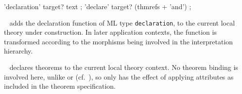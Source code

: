 \begin{isabellebody}
\begin{isamarkuptext}
  \begin{rail}
    'declaration' target? text
    ;
    'declare' target? (thmrefs + 'and')
    ;
  \end{rail}

  \begin{description}

  \item \hyperlink{command.declaration}{\mbox{}}~ adds the declaration
  function  of ML type \verb|declaration|, to the current
  local theory under construction.  In later application contexts, the
  function is transformed according to the morphisms being involved in
  the interpretation hierarchy.

  \item \hyperlink{command.declare}{\mbox{}}~ declares theorems to the
  current local theory context.  No theorem binding is involved here,
  unlike \hyperlink{command.theorems}{\mbox{}} or \hyperlink{command.lemmas}{\mbox{}} (cf.\
  ), so \hyperlink{command.declare}{\mbox{}} only has the effect
  of applying attributes as included in the theorem specification.


\end{description}
\end{isamarkuptext}
\end{isabellebody}
